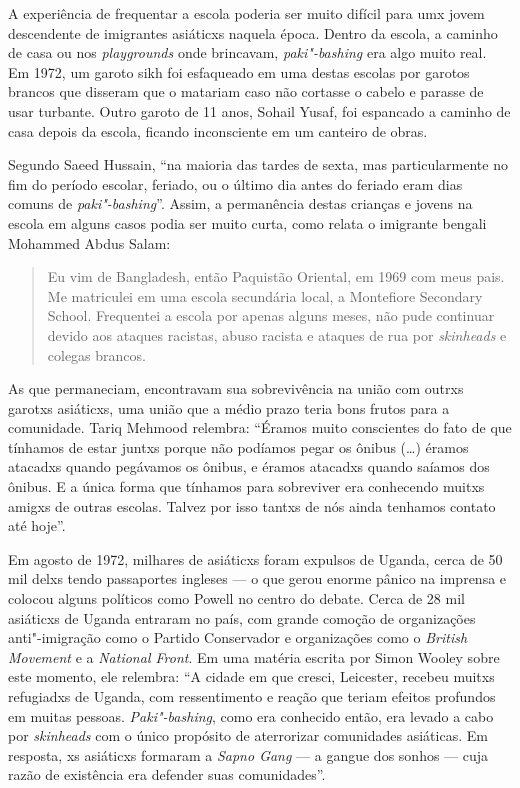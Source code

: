 A experiência de frequentar a escola poderia ser muito difícil para umx jovem descendente de imigrantes asiáticxs naquela época. Dentro da escola, a caminho de casa ou nos \emph{playgrounds} onde brincavam, \emph{paki"-bashing} era algo muito real. Em 1972, um garoto sikh foi esfaqueado em uma destas escolas por garotos brancos que disseram que o matariam caso não cortasse o cabelo e parasse de usar turbante. Outro garoto de 11 anos, Sohail Yusaf, foi espancado a caminho de casa depois da escola, ficando inconsciente em um canteiro de obras.

Segundo Saeed Hussain, ``na maioria das tardes de sexta, mas particularmente no fim do período escolar, feriado, ou o último dia antes do feriado eram dias comuns de \emph{paki"-bashing}''. Assim, a permanência destas crianças e jovens na escola em alguns casos podia ser muito curta, como relata o imigrante bengali Mohammed Abdus Salam:

\begin{quote}
Eu vim de Bangladesh, então Paquistão Oriental, em 1969 com meus pais. Me matriculei em uma escola secundária local, a Montefiore Secondary School. Frequentei a escola por apenas alguns meses, não pude continuar devido aos ataques racistas, abuso racista e ataques de rua por \emph{skinheads} e colegas brancos.
\end{quote}

As que permaneciam, encontravam sua sobrevivência na união com outrxs garotxs asiáticxs, uma união que a médio prazo teria bons frutos para a comunidade. Tariq Mehmood relembra: ``Éramos muito conscientes do fato de que tínhamos de estar juntxs porque não podíamos pegar os ônibus (\ldots{}) éramos atacadxs quando pegávamos os ônibus, e éramos atacadxs quando saíamos dos ônibus. E a única forma que tínhamos para sobreviver era conhecendo muitxs amigxs de outras escolas. Talvez por isso tantxs de nós ainda tenhamos contato até hoje''.

Em agosto de 1972, milhares de asiáticxs foram expulsos de Uganda, cerca de 50 mil delxs tendo passaportes ingleses --- o que gerou enorme pânico na imprensa e colocou alguns políticos como Powell no centro do debate. Cerca de 28 mil asiáticxs de Uganda entraram no país, com grande comoção de organizações anti"-imigração como o Partido Conservador e organizações como o \emph{British Movement} e a \emph{National Front}. Em uma matéria escrita por Simon Wooley sobre este momento, ele relembra: ``A cidade em que cresci, Leicester, recebeu muitxs refugiadxs de Uganda, com ressentimento e reação que teriam efeitos profundos em muitas pessoas. \emph{Paki"-bashing}, como era conhecido então, era levado a cabo por \emph{skinheads} com o único propósito de aterrorizar comunidades asiáticas. Em resposta, xs asiáticxs formaram a \emph{Sapno Gang} --- a gangue dos sonhos --- cuja razão de existência era defender suas comunidades''.

